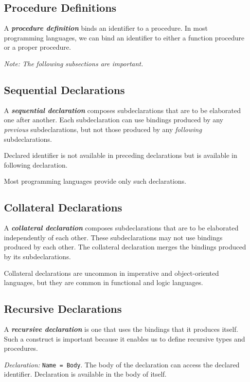 \subsection{Procedure Definitions}

A \textit{\textbf{procedure definition}} binds an identifier to a procedure. In most programming languages, we can bind an identifier to either a function procedure or a proper procedure.

\textit{Note: The following subsections are important.}

\subsection{Sequential Declarations}

A \textit{\textbf{sequential declaration}} composes subdeclarations that are to be elaborated one after another. Each subdeclaration can use bindings produced by any \textit{previous} subdeclarations, but not those produced by any \textit{following} subdeclarations.

Declared identifier is not available in preceding declarations but is available in following declaration.

Most programming languages provide only such declarations.

\subsection{Collateral Declarations}

A \textit{\textbf{collateral declaration}} composes subdeclarations that are to be elaborated independently of each other. These subdeclarations may not use bindings produced by each other. The collateral declaration merges the bindings produced by its subdeclarations.

Collateral declarations are uncommon in imperative and object-oriented languages, but they are common in functional and logic languages.

\subsection{Recursive Declarations}

A \textit{\textbf{recursive declaration}} is one that uses the bindings that it produces itself. Such a construct is important because it enables us to define recursive types and procedures.

\textit{Declaration:} \texttt{Name = Body}. The body of the declaration can access the declared identifier. Declaration is available in the body of itself.

